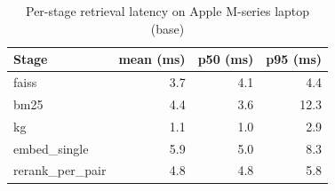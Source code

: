 \begin{table}
\caption{Per-stage retrieval latency on Apple M-series laptop (base)}
\label{tab:latency_base}
\begin{tabular}{lrrr}
\toprule
Stage & mean (ms) & p50 (ms) & p95 (ms) \\
\midrule
faiss & 3.7 & 4.1 & 4.4 \\
bm25 & 4.4 & 3.6 & 12.3 \\
kg & 1.1 & 1.0 & 2.9 \\
embed\_single & 5.9 & 5.0 & 8.3 \\
rerank\_per\_pair & 4.8 & 4.8 & 5.8 \\
\bottomrule
\end{tabular}
\end{table}
